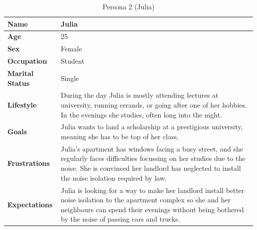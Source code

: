 \begin{table}[H]
    \centering
    \begin{tabularx}{\textwidth}{l X}
        \toprule
        \textbf{Name}           & Julia                                                                                                                \\
        \midrule
        \textbf{Age}            & 25                                                                                                                   \\
        \midrule
        \textbf{Sex}            & Female                                                                                                               \\
        \midrule
        \textbf{Occupation}     & Student                                                                                                              \\
        \midrule
        \textbf{Marital Status} & Single                                                                                                               \\
        \midrule
        \textbf{Lifestyle}      & During the day Julia is mostly attending lectures at university, running errands, or going after one of her hobbies.
        In the evenings she studies, often long into the night.                                                                                        \\
        \midrule
        \textbf{Goals}          & Julia wants to land a scholarship at a prestigious university, meaning she has to be top of her class.               \\
        \midrule
        \textbf{Frustrations}   & Julia's apartment has windows facing a busy street, and she regularly faces difficulties focussing on her studies
        due to the noise. She is convinced her landlord has neglected to install the noise isolation required by law.                                  \\
        \midrule
        \textbf{Expectations}   & Julia is looking for a way to make her landlord install better noise isolation to the apartment complex so she and
        her neighbours can spend their evenings without being bothered by the noise of passing cars and trucks.                                        \\
        \bottomrule
    \end{tabularx}
    \caption{Persona 2 (Julia)}\label{table:persona2}
\end{table}

